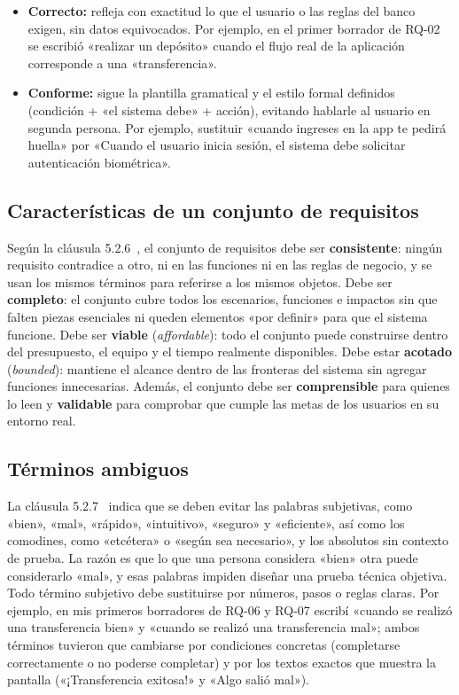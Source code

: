 \documentclass[11pt,a4paper]{article}
\begin{document}
\begin{itemize}
  \item \textbf{Correcto:} refleja con exactitud lo que el usuario o las reglas del banco exigen, sin datos equivocados. Por ejemplo, en el primer borrador de RQ-02 se escribió «realizar un depósito» cuando el flujo real de la aplicación corresponde a una «transferencia».
  \item \textbf{Conforme:} sigue la plantilla gramatical y el estilo formal definidos (condición + «el sistema debe» + acción), evitando hablarle al usuario en segunda persona. Por ejemplo, sustituir «cuando ingreses en la app te pedirá huella» por «Cuando el usuario inicia sesión, el sistema debe solicitar autenticación biométrica».
\end{itemize}

\subsection{Características de un conjunto de requisitos}
Según la cláusula 5.2.6~\cite{iso29148}, el conjunto de requisitos debe ser \textbf{consistente}: ningún requisito contradice a otro, ni en las funciones ni en las reglas de negocio, y se usan los mismos términos para referirse a los mismos objetos. Debe ser \textbf{completo}: el conjunto cubre todos los escenarios, funciones e impactos sin que falten piezas esenciales ni queden elementos «por definir» para que el sistema funcione. Debe ser \textbf{viable} (\textit{affordable}): todo el conjunto puede construirse dentro del presupuesto, el equipo y el tiempo realmente disponibles. Debe estar \textbf{acotado} (\textit{bounded}): mantiene el alcance dentro de las fronteras del sistema sin agregar funciones innecesarias. Además, el conjunto debe ser \textbf{comprensible} para quienes lo leen y \textbf{validable} para comprobar que cumple las metas de los usuarios en su entorno real.

\subsection{Términos ambiguos}
La cláusula 5.2.7~\cite{iso29148} indica que se deben evitar las palabras subjetivas, como «bien», «mal», «rápido», «intuitivo», «seguro» y «eficiente», así como los comodines, como «etcétera» o «según sea necesario», y los absolutos sin contexto de prueba. La razón es que lo que una persona considera «bien» otra puede considerarlo «mal», y esas palabras impiden diseñar una prueba técnica objetiva. Todo término subjetivo debe sustituirse por números, pasos o reglas claras. Por ejemplo, en mis primeros borradores de RQ-06 y RQ-07 escribí «cuando se realizó una transferencia bien» y «cuando se realizó una transferencia mal»; ambos términos tuvieron que cambiarse por condiciones concretas (completarse correctamente o no poderse completar) y por los textos exactos que muestra la pantalla («¡Transferencia exitosa!» y «Algo salió mal»).
\end{document}
